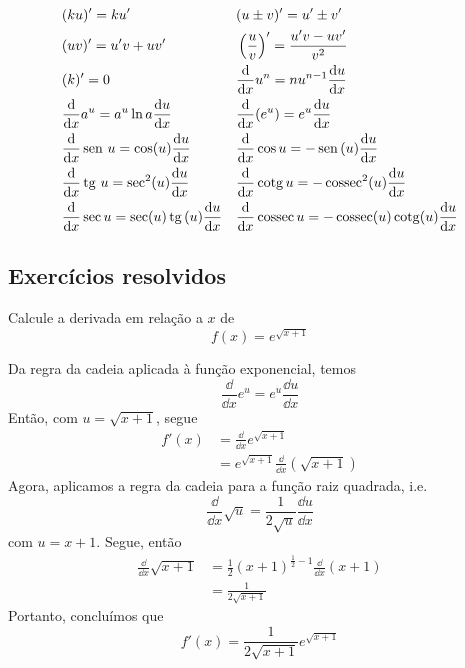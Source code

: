 \cleardoublepage\documentclass[../main.tex]{subfiles}
\begin{document}
\begin{align}
  & (ku)' = ku' && (u\pm v)' = u' \pm v'\\
  & (uv)' = u'v + uv' && \left(\frac{u}{v}\right)' = \frac{u'v - uv'}{v^2} \\
  & (k)' = 0 && \frac{\mathrm{d}}{\mathrm{d} x}u^n = nu^{n-1}\frac{\mathrm{d} u}{\mathrm{d} x}\\
  & \frac{\mathrm{d}}{\mathrm{d} x}a^u = a^u\ln a\frac{\mathrm{d} u}{\mathrm{d} x} && \frac{\mathrm{d}}{\mathrm{d} x}(e^u) = e^u\frac{\mathrm{d} u}{\mathrm{d} x} \\
  & \frac{\mathrm{d}}{\mathrm{d} x}\operatorname{sen}\, u = \cos(u)\frac{\mathrm{d} u}{\mathrm{d} x} && \frac{\mathrm{d}}{\mathrm{d} x}\cos u = - \operatorname{sen}\,(u)\frac{\mathrm{d} u}{\mathrm{d} x}\\
  & \frac{\mathrm{d}}{\mathrm{d} x}\operatorname{tg}\, u = \sec^2(u)\frac{\mathrm{d} u}{\mathrm{d} x} && \frac{\mathrm{d}}{\mathrm{d} x}\operatorname{cotg} u = -\operatorname{cossec}^2(u)\frac{\mathrm{d} u}{\mathrm{d} x} \\
  & \frac{\mathrm{d}}{\mathrm{d} x}\sec u = \sec(u)\operatorname{tg}\,(u)\frac{\mathrm{d} u}{\mathrm{d} x} && \frac{\mathrm{d}}{\mathrm{d} x}\operatorname{cossec} u = -\operatorname{cossec}(u)\operatorname{cotg}(u)\frac{\mathrm{d} u}{\mathrm{d} x}
\end{align}

\subsection{Exercícios resolvidos}

\begin{exeresol}
  Calcule a derivada em relação a $x$ de
  \begin{equation*}
    f(x) = e^{\sqrt{x+1}}
  \end{equation*}
\end{exeresol}
\begin{resol}
  Da regra da cadeia aplicada à função exponencial, temos
  \begin{equation*}
    \frac{\dd}{\dd x}e^u = e^u\frac{\dd u}{\dd x}
  \end{equation*}
  Então, com $u = \sqrt{x+1}$, segue
  \begin{align*}
    f'(x) &= \frac{\dd}{\dd x}e^{\sqrt{x+1}} \\
          &= e^{\sqrt{x+1}}\frac{\dd}{\dd x}\left(\sqrt{x+1}\right)
  \end{align*}
  Agora, aplicamos a regra da cadeia para a função raiz quadrada, i.e.
  \begin{equation*}
    \frac{\dd}{\dd x}\sqrt{u} = \frac{1}{2\sqrt{u}}\frac{\dd u}{\dd x}
  \end{equation*}
  com $u = x+1$. Segue, então
  \begin{align*}
    \frac{\dd}{\dd x}\sqrt{x+1} &= \frac{1}{2}(x+1)^{\frac{1}{2}-1}\frac{\dd}{\dd x}(x+1) \\
                                &= \frac{1}{2\sqrt{x+1}}
  \end{align*}
  Portanto, concluímos que
  \begin{equation*}
    f'(x) = \frac{1}{2\sqrt{x+1}}e^{\sqrt{x+1}}
  \end{equation*}
\end{resol}
\end{document}
